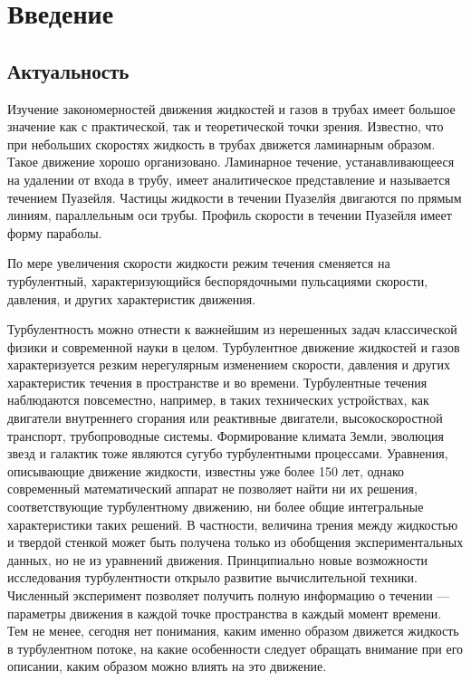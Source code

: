 \chapter{Введение}

\section{Актуальность}



Изучение закономерностей движения жидкостей и газов в трубах имеет большое значение как с практической, так и теоретической точки зрения. Известно, что при небольших скоростях жидкость в трубах движется ламинарным образом. Такое движение хорошо организовано. Ламинарное течение, устанавливающееся на удалении от входа в трубу, имеет аналитическое представление и называется течением Пуазейля. Частицы жидкости в течении Пуазелйя двигаются по прямым линиям, параллельным оси трубы. Профиль скорости в течении Пуазейля имеет форму параболы. 

По мере увеличения скорости жидкости режим течения сменяется на турбулентный, характеризующийся беспорядочными пульсациями скорости, давления, и других характеристик движения. 


Турбулентность можно отнести к важнейшим из нерешенных задач классической физики и современной науки в целом. Турбулентное движение жидкостей и газов характеризуется резким нерегулярным изменением скорости, давления и других характеристик течения в пространстве и во времени. Турбулентные течения наблюдаются повсеместно, например, в таких технических устройствах, как двигатели внутреннего сгорания или реактивные двигатели, высокоскоростной транспорт, трубопроводные системы. Формирование климата Земли, эволюция звезд и галактик тоже являются сугубо турбулентными процессами. Уравнения, описывающие движение жидкости, известны уже более 150 лет, однако современный математический аппарат не позволяет найти ни их решения, соответствующие турбулентному движению, ни более общие интегральные характеристики таких решений. В частности, величина трения между жидкостью и твердой стенкой может быть получена только из обобщения экспериментальных данных, но не из уравнений движения. Принципиально новые возможности исследования турбулентности открыло развитие вычислительной техники. Численный эксперимент позволяет получить полную информацию о течении --- параметры движения в каждой точке пространства в каждый момент времени. Тем не менее, сегодня нет понимания, каким именно образом движется жидкость в турбулентном потоке, на какие особенности следует обращать внимание при его описании, каким образом можно влиять на это движение. 


